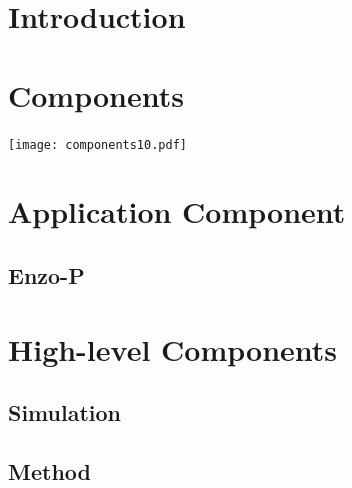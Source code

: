 \documentclass{paper}
\begin{document}


\section{Introduction} \label{s:intro}
\section{Components}
\centerline{\texttt{[image: components10.pdf]}}
\section{Application Component}
\subsection{Enzo-P}
\section{High-level Components}
\subsection{Simulation}
\subsection{Method}
\end{document}
